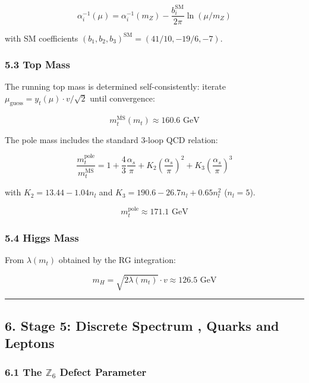 \[\alpha_i^{-1}(\mu) = \alpha_i^{-1}(m_Z) - \frac{b_i^{\text{SM}}}{2\pi}\ln(\mu/m_Z)\]

with SM coefficients \((b_1, b_2, b_3)^{\text{SM}} = (41/10, -19/6, -7)\).

\subsubsection{5.3 Top Mass}\label{53-top-mass}

The running top mass is determined self-consistently: iterate \(\mu_{\text{guess}} = y_t(\mu) \cdot v/\sqrt{2}\) until convergence:

\[m_t^{\overline{\text{MS}}}(m_t) \approx 160.6 \text{ GeV}\]

The pole mass includes the standard 3-loop QCD relation:

\[\frac{m_t^{\text{pole}}}{m_t^{\overline{\text{MS}}}} = 1 + \frac{4}{3}\frac{\alpha_s}{\pi} + K_2 \left(\frac{\alpha_s}{\pi}\right)^2 + K_3 \left(\frac{\alpha_s}{\pi}\right)^3\]

with \(K_2 = 13.44 - 1.04 n_l\) and \(K_3 = 190.6 - 26.7 n_l + 0.65 n_l^2\) (\(n_l = 5\)).

\[m_t^{\text{pole}} \approx 171.1 \text{ GeV}\]

\subsubsection{5.4 Higgs Mass}\label{54-higgs-mass}

From \(\lambda(m_t)\) obtained by the RG integration:

\[m_H = \sqrt{2\lambda(m_t)} \cdot v \approx 126.5 \text{ GeV}\]

\begin{center}\rule{0.5\linewidth}{0.5pt}\end{center}

\subsection{6. Stage 5: Discrete Spectrum , Quarks and Leptons}\label{6-stage-5-discrete-spectrum--quarks-and-leptons}

\subsubsection{\texorpdfstring{6.1 The \(\mathbb{Z}_6\) Defect Parameter}{6.1 The \textbackslash mathbb\{Z\}\_6 Defect Parameter}}\label{61-the-mathbbz_6-defect-parameter}

